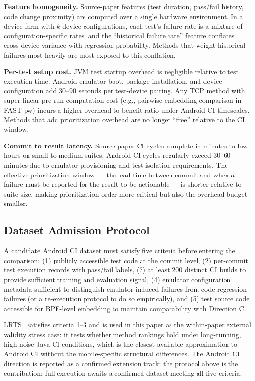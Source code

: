 \documentclass[conference]{IEEEtran}
\begin{document}
\textbf{Feature homogeneity.} Source-paper features (test duration, pass/fail history, code change proximity) are computed over a single hardware environment. In a device farm with $k$ device configurations, each test's failure rate is a mixture of configuration-specific rates, and the ``historical failure rate'' feature conflates cross-device variance with regression probability. Methods that weight historical failures most heavily are most exposed to this conflation.

\textbf{Per-test setup cost.} JVM test startup overhead is negligible relative to test execution time. Android emulator boot, package installation, and device configuration add 30--90 seconds per test-device pairing. Any TCP method with super-linear pre-run computation cost (e.g., pairwise embedding comparison in FAST-pw) incurs a higher overhead-to-benefit ratio under Android CI timescales. Methods that add prioritization overhead are no longer ``free'' relative to the CI window.

\textbf{Commit-to-result latency.} Source-paper CI cycles complete in minutes to low hours on small-to-medium suites. Android CI cycles regularly exceed 30--60 minutes due to emulator provisioning and test isolation requirements. The effective prioritization window — the lead time between commit and when a failure must be reported for the result to be actionable — is shorter relative to suite size, making prioritization order more critical but also the overhead budget smaller.

\subsection{Dataset Admission Protocol}

A candidate Android CI dataset must satisfy five criteria before entering the comparison: (1) publicly accessible test code at the commit level, (2) per-commit test execution records with pass/fail labels, (3) at least 200 distinct CI builds to provide sufficient training and evaluation signal, (4) emulator configuration metadata sufficient to distinguish emulator-induced failures from code-regression failures (or a re-execution protocol to do so empirically), and (5) test source code accessible for BPE-level embedding to maintain comparability with Direction C.

LRTS~\cite{lrts2024} satisfies criteria 1--3 and is used in this paper as the within-paper external validity stress case: it tests whether method rankings hold under long-running, high-noise Java CI conditions, which is the closest available approximation to Android CI without the mobile-specific structural differences. The Android CI direction is reported as a confirmed extension track: the protocol above is the contribution; full execution awaits a confirmed dataset meeting all five criteria.
\end{document}
